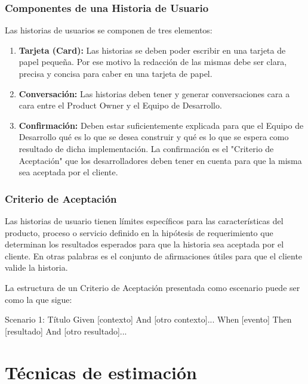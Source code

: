 
\subsubsection{Componentes de una Historia de Usuario}

Las historias de usuarios se componen de tres elementos:

\begin{enumerate}

\item \textbf{Tarjeta (Card):} Las historias se deben poder escribir en una tarjeta de papel pequeña. Por ese motivo la redacción de las mismas debe ser clara, precisa y concisa para caber en una tarjeta de papel.

\item \textbf{Conversación:} Las historias deben tener y generar conversaciones cara a cara entre el Product Owner y el Equipo de Desarrollo.

\item \textbf{Confirmación:} Deben estar suficientemente explicada para que el Equipo de Desarrollo qué es lo que se desea construir y qué es lo que se espera como resultado de dicha implementación. La confirmación es el "Criterio de Aceptación" que los desarrolladores deben tener en cuenta para que la misma sea aceptada por el cliente.

\end{enumerate}

\subsubsection{Criterio de Aceptación}

Las historias de usuario tienen límites específicos para las características del producto, proceso o servicio definido en la hipótesis de requerimiento que determinan los resultados esperados para que la historia sea aceptada por el cliente. En otras palabras es el conjunto de afirmaciones útiles para que el cliente valide la historia.

La estructura de un Criterio de Aceptación presentada como escenario puede ser como la que sigue:
 
Scenario 1: Título
Given [contexto]
  And [otro contexto]...
When  [evento]
Then  [resultado]
  And [otro resultado]...
  
  
\newpage
\section{Técnicas de estimación}

